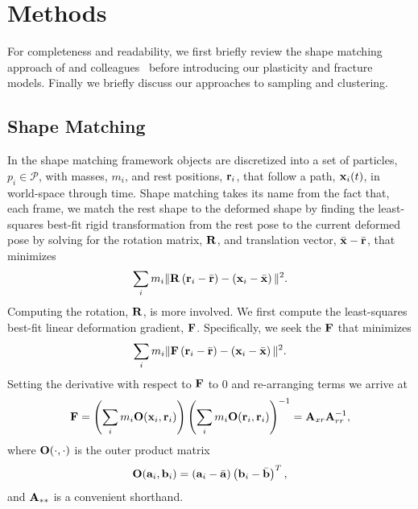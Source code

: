 \documentclass[conference]{acmsiggraph}
\begin{document}
\section{Methods}
For completeness and readability, we first briefly review the shape matching approach of \Mueller and colleagues~ before
introducing our plasticity and fracture models.  Finally we briefly discuss our approaches to sampling and clustering.
\subsection{Shape Matching}
\label{sec:ShapeMatching}
In the shape matching framework
objects are discretized into a set of particles, $p_i\in\mathcal{P}$, with masses, $m_i$, and rest positions, $\mathit{\mathbf{r}}_i$, 
that follow a path, $\mathit{\mathbf{x}}_i(t)$, in world-space through time.  
Shape matching takes its name from the fact that, each frame, we match the rest shape to 
the deformed shape by finding
the least-squares best-fit rigid transformation from the rest pose
to the current deformed pose by
solving for the rotation matrix, $\mathit{\mathbf{R}}$, and translation
vector, $\bar{\mathit{\mathbf{x}}}-\bar{\mathit{\mathbf{r}}}$, that minimizes
\begin{equation}
\label{eq:sm}
\sum_i m_i \| \mathit{\mathbf{R}}\left(\mathit{\mathbf{r}}_i - \bar{\mathit{\mathbf{r}}}\right)-\left(\mathit{\mathbf{x}}_i-\bar{\mathit{\mathbf{x}}}\right)\|^2.
\end{equation}
Computing the rotation, $\mathit{\mathbf{R}}$, is more involved.  
We first compute the least-squares best-fit linear deformation gradient, $\mathit{\mathbf{F}}$.
Specifically, we seek the $\mathit{\mathbf{F}}$ that minimizes
\begin{equation}
\sum_i m_i \| \mathit{\mathbf{F}}\left(\mathit{\mathbf{r}}_i - \bar{\mathit{\mathbf{r}}}\right)-\left(\mathit{\mathbf{x}}_i-\bar{\mathit{\mathbf{x}}}\right)\|^2.
\end{equation}
Setting the derivative with respect to $\mathit{\mathbf{F}}$ to $0$ and re-arranging terms we arrive at
\begin{equation}
\label{eq:defgrad}
\mathit{\mathbf{F}} = \left(\sum_i m_i \mathit{\mathbf{O}}(\mathit{\mathbf{x}}_i,\mathit{\mathbf{r}}_i)\right)\left(\sum_im_i\mathit{\mathbf{O}}(\mathit{\mathbf{r}}_i,\mathit{\mathbf{r}}_i)\right)^{-1} = \mathit{\mathbf{A}}_{xr}\mathit{\mathbf{A}}_{rr}^{-1},
\end{equation}
where $\mathit{\mathbf{O}}(\cdot,\cdot)$ is the outer product matrix
\begin{equation}
\mathit{\mathbf{O}}(\mathit{\mathbf{a}}_i,\mathit{\mathbf{b}}_i) = \left(\mathit{\mathbf{a}}_i-\bar{\mathit{\mathbf{a}}}\right)\left(\mathit{\mathbf{b}}_{i}-\bar{\mathit{\mathbf{b}}}\right)^T,
\end{equation}
and $\mathit{\mathbf{A}}_{**}$ is a convenient shorthand.
\end{document}

